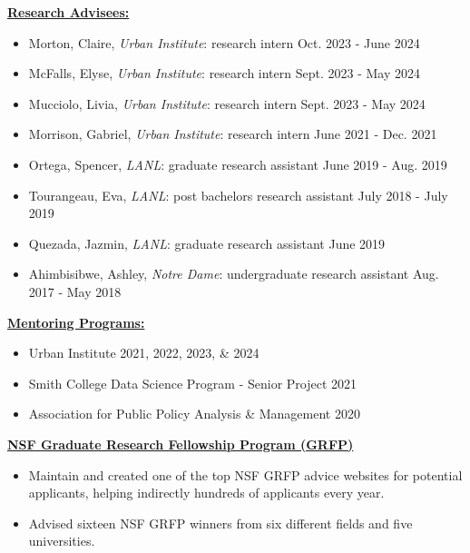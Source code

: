 
\underline{\textbf{\large Research Advisees:}}\normalsize

    \begin{itemize}
        \item Morton, Claire, \textit{Urban Institute}: research intern \hfill Oct. 2023 - June 2024
        \item McFalls, Elyse, \textit{Urban Institute}: research intern \hfill Sept. 2023 - May 2024
        \item Mucciolo, Livia, \textit{Urban Institute}: research intern \hfill Sept. 2023 - May 2024
        \item Morrison, Gabriel, \textit{Urban Institute}: research intern \hfill June 2021 - Dec. 2021
        \item Ortega, Spencer, \textit{LANL}: graduate research assistant \hfill June 2019 - Aug. 2019
        \item Tourangeau, Eva, \textit{LANL}: post bachelors research assistant \hfill July 2018 - July 2019
        \item Quezada, Jazmin, \textit{LANL}: graduate research assistant \hfill June 2019
        \item Ahimbisibwe, Ashley, \textit{Notre Dame}: undergraduate research assistant \hfill Aug. 2017 - May 2018
    \end{itemize}

\vspace{4pt}
\underline{\textbf{\large Mentoring Programs:}}\normalsize

    \begin{itemize}
        \item Urban Institute \hfill 2021, 2022, 2023, \& 2024
        \item Smith College Data Science Program - Senior Project \hfill 2021
        \item Association for Public Policy Analysis \& Management \hfill 2020
    \end{itemize}

\vspace{4pt}
\underline{\textbf{\large NSF Graduate Research Fellowship Program (GRFP)}}\normalsize
    \begin{itemize}
        \item Maintain and created one of the top NSF GRFP advice websites for potential applicants, helping indirectly hundreds of applicants every year.
        \item Advised sixteen NSF GRFP winners from six different fields and five universities.
    \end{itemize}

